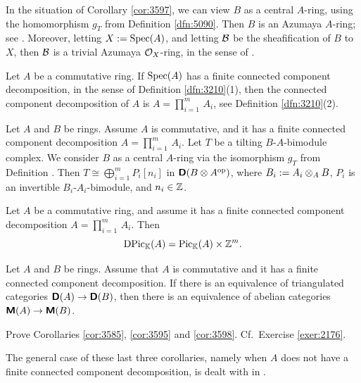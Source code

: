 \begin{rem} \label{rem:3610}
In the situation of Corollary \ref{cor:3597}, we can view $B$ as a central 
$A$-ring, using the homomorphism $g_T$ from Definition \ref{dfn:5090}. Then $B$ 
is an Azumaya $A$-ring; see \cite[Section 5.3]{Row}. Moreover, letting 
$X := \operatorname{Spec}(A)$, and letting $\mathcal{B}$ be the sheafification of $B$ to $X$, 
then $\mathcal{B}$ is a trivial Azumaya $\mathcal{O}_X$-ring, in the sense of 
\cite[Section IV.2]{Mil}.
\end{rem}

Let $A$ be a commutative ring. If $\operatorname{Spec}(A)$ has a finite connected 
component decomposition, in the sense of Definition \ref{dfn:3210}(1),
then the connected component decomposition of $A$ is 
$A = \prod_{i = 1}^m \, A_i$, see Definition \ref{dfn:3210}(2).

\begin{cor} \label{cor:3585}
Let $A$ and $B$ be rings. Assume $A$ is commutative, and it 
has a finite connected component decomposition 
$A = \prod_{i = 1}^m \, A_i$.
Let $T$ be a tilting $B$-$A$-bimodule complex. We consider $B$ as a central 
$A$-ring via the isomorphism $g_T$ from Definition \tup{\ref{dfn:5090}}. Then 
$T \cong \bigoplus\nolimits_{i = 1}^m P_i[n_i]$
in $\boldsymbol{\mathsf{D}}(B \otimes A^{\mathrm{op}})$,
where $B_i := A_i \otimes_A B$, $P_i$ is an invertible $B_i$-$A_i$-bimodule, and 
$n_i \in \mathbb{Z}$. 
\end{cor}

\begin{cor} \label{cor:3595} 
Let $A$ be a commutative ring, and assume it has 
a finite connected component decomposition $A = \prod_{i = 1}^m \, A_i$.
Then 
\[ \operatorname{DPic}_{\mathbb{K}}(A) = \operatorname{Pic}_{\mathbb{K}}(A) \times \mathbb{Z}^m . \] 
\end{cor}

\begin{cor} \label{cor:3598} 
Let $A$ and $B$ be rings. Assume that $A$ is commutative and it has a  
finite connected component decomposition. 
If there is an equivalence of triangulated categories
$\boldsymbol{\mathsf{D}}(A) \to \boldsymbol{\mathsf{D}}(B)$, then there is an equivalence of 
abelian categories $\boldsymbol{\mathsf{M}}(A) \to \boldsymbol{\mathsf{M}}(B)$. 
\end{cor}

\begin{exer} \label{exer:3585}
Prove Corollaries \ref{cor:3585}, \ref{cor:3595} and \ref{cor:3598}. Cf.\ 
Exercise \ref{exer:2176}. 
\end{exer}

The general case of these last three corollaries, namely when $A$ 
does not have a finite connected component decomposition, is dealt with in 
\cite[Theorem 6.13]{Ye8}. 

